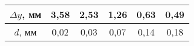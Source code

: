 \begin{table}[h!]
    \centering
    \begin{tabular}{|c|c|c|c|c|c|}
    \hline
    $\Delta y$, мм & 3,58 & 2,53 & 1,26 & 0,63 & 0,49 \\ \hline
    $d$, мм        & 0,02 & 0,03 & 0,07 & 0,14 & 0,18 \\ \hline
    \end{tabular}
\end{table}
